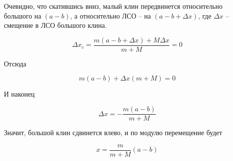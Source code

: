 \documentclass[a5paper,10pt]{article}\usepackage[usenames,dvipsnames]{color}
\begin{document}
Очевидно, что скатившись вниз, малый клин передвинется относительно большого на $(a-b)$, а относительно ЛСО -- на $(a-b+\Delta{x})$, где $\Delta{x}$ -- смещение в ЛСО большого клина.

\begin{equation}
    \Delta{x}_c=\frac{m(a-b+\Delta{x})+M\Delta{x}}{m+M}=0
\end{equation}

Отсюда

\begin{equation}
    m(a-b)+\Delta{x}(m+M)=0
\end{equation}

И наконец

\begin{equation}
    \Delta{x}=-\frac{m(a-b)}{m+M}
\end{equation}

Значит, большой клин сдвинется влево, и по модулю перемещение будет

\begin{equation}
    x=\frac{m}{m+M}(a-b)
\end{equation}
\end{document}

